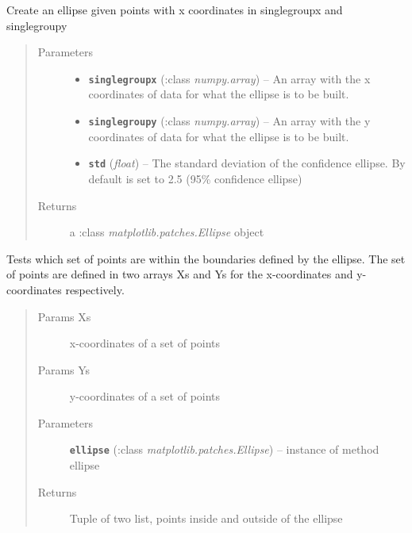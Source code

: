 \documentclass[letterpaper,10pt,english]{sphinxmanual}
\begin{document}

\begin{fulllineitems}
\label{Doc:Moduler.ellipse}
Create an ellipse given points with x coordinates in singlegroupx and singlegroupy
\begin{quote}\begin{description}
\item[{Parameters}] \leavevmode\begin{itemize}
\item {} 
\textbf{\texttt{singlegroupx}} (:class \emph{numpy.array}) -- An array with the x coordinates of data for what the ellipse is to be built.

\item {} 
\textbf{\texttt{singlegroupy}} (:class \emph{numpy.array}) -- An array with the y coordinates of data for what the ellipse is to be built.

\item {} 
\textbf{\texttt{std}} (\emph{float}) -- The standard deviation of the confidence ellipse. By default is set to 2.5 (95\% confidence ellipse)

\end{itemize}

\item[{Returns}] \leavevmode
a :class \emph{matplotlib.patches.Ellipse} object

\end{description}\end{quote}

\end{fulllineitems}


\begin{fulllineitems}
\label{Doc:Moduler.pointsInEllipse}
Tests which set of points are within the boundaries defined by the ellipse. The set of points
are defined in two arrays Xs and Ys for the x-coordinates and y-coordinates respectively.
\begin{quote}\begin{description}
\item[{Params Xs}] \leavevmode
x-coordinates of a set of points

\item[{Params Ys}] \leavevmode
y-coordinates of a set of points

\item[{Parameters}] \leavevmode
\textbf{\texttt{ellipse}} (:class \emph{matplotlib.patches.Ellipse}) -- instance of method ellipse

\item[{Returns}] \leavevmode
Tuple of two list, points inside and outside of the ellipse

\end{description}\end{quote}

\end{fulllineitems}
\end{document}
